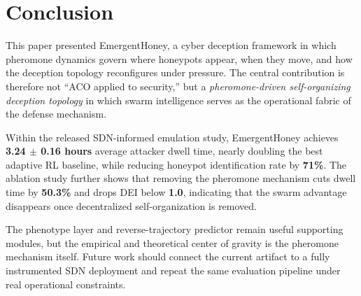 \documentclass[review,3p,twocolumn]{elsarticle}
\begin{document}
\section{Conclusion}
\label{sec:conclusion}

This paper presented EmergentHoney, a cyber deception framework in which pheromone dynamics govern where honeypots appear, when they move, and how the deception topology reconfigures under pressure. The central contribution is therefore not ``ACO applied to security,'' but a \emph{pheromone-driven self-organizing deception topology} in which swarm intelligence serves as the operational fabric of the defense mechanism.

Within the released SDN-informed emulation study, EmergentHoney achieves \textbf{3.24 $\pm$ 0.16 hours} average attacker dwell time, nearly doubling the best adaptive RL baseline, while reducing honeypot identification rate by \textbf{71\%}. The ablation study further shows that removing the pheromone mechanism cuts dwell time by \textbf{50.3\%} and drops DEI below \textbf{1.0}, indicating that the swarm advantage disappears once decentralized self-organization is removed.

The phenotype layer and reverse-trajectory predictor remain useful supporting modules, but the empirical and theoretical center of gravity is the pheromone mechanism itself. Future work should connect the current artifact to a fully instrumented SDN deployment and repeat the same evaluation pipeline under real operational constraints.



\end{document}
